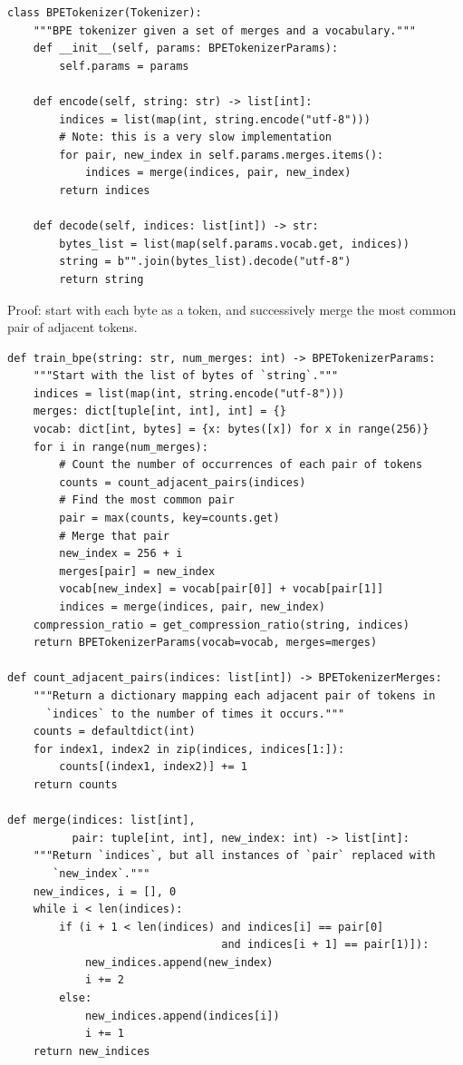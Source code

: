 \documentclass[12pt,twoside]{article}
\begin{document}
\begin{verbatim}
class BPETokenizer(Tokenizer):
    """BPE tokenizer given a set of merges and a vocabulary."""
    def __init__(self, params: BPETokenizerParams):
        self.params = params   
    
    def encode(self, string: str) -> list[int]:
        indices = list(map(int, string.encode("utf-8")))  
        # Note: this is a very slow implementation
        for pair, new_index in self.params.merges.items():  
            indices = merge(indices, pair, new_index)  
        return indices  
    
    def decode(self, indices: list[int]) -> str:
        bytes_list = list(map(self.params.vocab.get, indices))  
        string = b"".join(bytes_list).decode("utf-8")  
        return string
\end{verbatim}

Proof: start with each byte as a token, and successively merge the most common pair of adjacent tokens.

\begin{verbatim}
def train_bpe(string: str, num_merges: int) -> BPETokenizerParams:  
    """Start with the list of bytes of `string`."""
    indices = list(map(int, string.encode("utf-8")))  
    merges: dict[tuple[int, int], int] = {}
    vocab: dict[int, bytes] = {x: bytes([x]) for x in range(256)}    
    for i in range(num_merges):
        # Count the number of occurrences of each pair of tokens
        counts = count_adjacent_pairs(indices)  
        # Find the most common pair
        pair = max(counts, key=counts.get)  
        # Merge that pair
        new_index = 256 + i  
        merges[pair] = new_index  
        vocab[new_index] = vocab[pair[0]] + vocab[pair[1]]  
        indices = merge(indices, pair, new_index)       
    compression_ratio = get_compression_ratio(string, indices)   
    return BPETokenizerParams(vocab=vocab, merges=merges)

def count_adjacent_pairs(indices: list[int]) -> BPETokenizerMerges:
    """Return a dictionary mapping each adjacent pair of tokens in 
      `indices` to the number of times it occurs."""
    counts = defaultdict(int)
    for index1, index2 in zip(indices, indices[1:]):
        counts[(index1, index2)] += 1
    return counts
    
def merge(indices: list[int], 
          pair: tuple[int, int], new_index: int) -> list[int]:  
    """Return `indices`, but all instances of `pair` replaced with 
       `new_index`."""
    new_indices, i = [], 0     
    while i < len(indices):
        if (i + 1 < len(indices) and indices[i] == pair[0] 
                                 and indices[i + 1] == pair[1)]):
            new_indices.append(new_index)
            i += 2
        else:
            new_indices.append(indices[i])
            i += 1   
    return new_indices
\end{verbatim}
    
\end{document}
